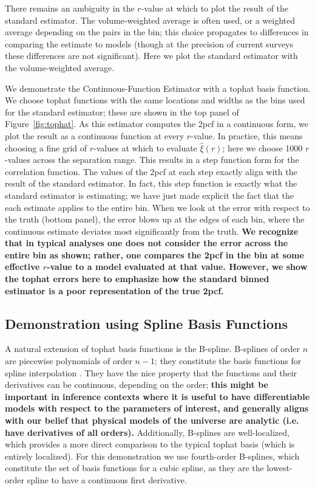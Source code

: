 \documentclass[modern]{aastex62}
\newcommand{\cf}{2pcf\xspace}
\newcommand{\est}{the Continuous-Function Estimator\xspace}
\newcommand{\new}[1]{\textbf{#1}}
\begin{document}
There remains an ambiguity in the $r$-value at which to plot the result of the standard estimator. 
The volume-weighted average is often used, or a weighted average depending on the pairs in the bin; this choice propagates to differences in comparing the estimate to models (though at the precision of current surveys these differences are not significant).
Here we plot the standard estimator with the volume-weighted average.

We demonstrate \est with a tophat basis function.
We choose tophat functions with the same locations and widths as the bins used for the standard estimator; these are shown in the top panel of Figure~\ref{fig:tophat}. 
As this estimator computes the \cf in a continuous form, we plot the result as a continuous function at every $r$-value.
In practice, this means choosing a fine grid of $r$-values at which to evaluate $\hat{\xi}(r)$; here we choose 1000 $r$-values across the separation range.
This results in a step function form for the correlation function.
The values of the \cf at each step exactly align with the result of the standard estimator.
In fact, this step function is exactly what the standard estimator is estimating; we have just made explicit the fact that the each estimate applies to the entire bin.
When we look at the error with respect to the truth (bottom panel), the error blows up at the edges of each bin, where the continuous estimate deviates most significantly from the truth.
\new{We recognize that in typical analyses one does not consider the error across the entire bin as shown; rather, one compares the \cf in the bin at some effective $r$-value to a model evaluated at that value.
However, we show the tophat errors here to emphasize  how the standard binned estimator is a poor representation of the true \cf.}

\subsection{Demonstration using Spline Basis Functions}
\label{sec:spline}

A natural extension of tophat basis functions is the B-spline.
B-splines of order $n$ are piecewise polynomials of order $n-1$; they constitute the basis functions for spline interpolation \citep{deBoor1987}.
They have the nice property that the functions and their derivatives can be continuous, depending on the order; \new{this might be important in inference contexts where it is useful to have differentiable models with respect to the parameters of interest, and generally aligns with our belief that physical models of the universe are analytic (i.e. have derivatives of all orders).}
Additionally, B-splines are well-localized, which provides a more direct comparison to the typical tophat basis (which is entirely localized).
For this demonstration we use fourth-order B-splines, which constitute the set of basis functions for a cubic spline, as they are the lowest-order spline to have a continuous first derivative.
\end{document}
